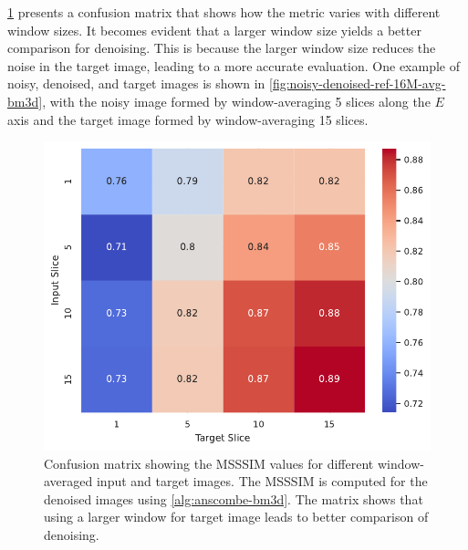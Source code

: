 \cref{fig:confusion_matrix_msssim_window_avg} presents a confusion matrix that shows how the metric varies with different window sizes.  It becomes evident that a larger window size yields a better comparison for denoising. This is because the larger window size reduces the noise in the target image, leading to a more accurate evaluation. One example of noisy, denoised, and target images is shown in \cref{fig:noisy-denoised-ref-16M-avg-bm3d}, with the noisy image formed by window-averaging 5 slices along the $E$ axis and the target image formed by window-averaging 15 slices. 

\begin{figure}
    \centering
    \includegraphics[width=0.5\linewidth]{images/confusion_matrix_msssim_window_avg.pdf}
    \caption{Confusion matrix showing the \gls{MSSSIM} values for different window-averaged input and target images. The \gls{MSSSIM} is computed for the denoised images using \cref{alg:anscombe-bm3d}. The matrix shows that using a larger window for target image leads to better comparison of denoising.}
    \label{fig:confusion_matrix_msssim_window_avg}
\end{figure}

